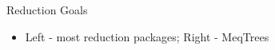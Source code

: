\documentclass[pdf,azure,slideColor,colorBG]{prosper}
\begin{document}
\begin{slide}{Reduction Goals}
\begin{small}
\begin{itemize}
\item Left - most reduction packages; Right - MeqTrees
\end{itemize}
\end{small}
{\centering
{}
}
\end{slide}
\end{document}
